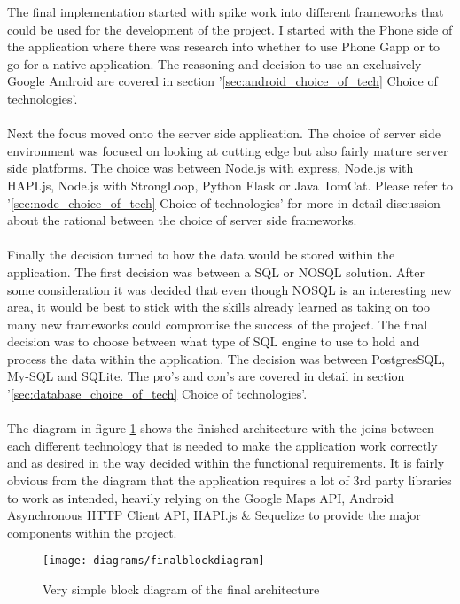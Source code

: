 \noindent
The final implementation started with spike work into different frameworks that could be used for the development of the project. I started with the Phone side of the application where there was research into whether to use Phone Gapp or to go for a native application. The reasoning and decision to use an exclusively Google Android are covered in section '\ref{sec:android_choice_of_tech} Choice of technologies'.\\
\\
Next the focus moved onto the server side application. The choice of server side environment was focused on looking at cutting edge but also fairly mature server side platforms. The choice was between Node.js with express, Node.js with HAPI.js, Node.js with StrongLoop, Python Flask or Java TomCat. Please refer to '\ref{sec:node_choice_of_tech} Choice of technologies' for more in detail discussion about the rational between the choice of server side frameworks.\\
\\
Finally the decision turned to how the data would be stored within the application. The first decision was between a SQL or NOSQL solution. After some consideration it was decided that even though NOSQL is an interesting new area, it would be best to stick with the skills already learned as taking on too many new frameworks could compromise the success of the project. The final decision was to choose between what type of SQL engine to use to hold and process the data within the application. The decision was between PostgresSQL, My-SQL and SQLite. The pro's and con's are covered in detail in section '\ref{sec:database_choice_of_tech} Choice of technologies'.\\
\\
The diagram in figure \ref{fig:final_block_diagram_image} shows the finished architecture with the joins between each different technology that is needed to make the application work correctly and as desired in the way decided within the functional requirements. It is fairly obvious from the diagram that the application requires a lot of 3rd party libraries to work as intended, heavily relying on the Google Maps API, Android Asynchronous HTTP Client API, HAPI.js \& Sequelize to provide the major components within the project.\\

\begin{figure}[H]
    \centering
    \texttt{[image: diagrams/finalblockdiagram]}
    \caption{Very simple block diagram of the final architecture}
    \label{fig:final_block_diagram_image}
\end{figure}

